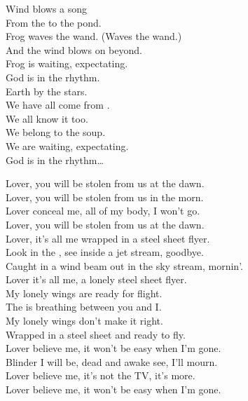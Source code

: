 Wind blows a song \\
From the  to the pond. \\
Frog waves the wand. (Waves the wand.) \\
And the wind blows on beyond. \\

Frog is waiting, expectating. \\
God is in the rhythm. \\

Earth by the stars. \\
We have all come from . \\
We all know it too. \\
We belong to the soup. \\

We are waiting, expectating. \\
God is in the rhythm… \\




Lover, you will be stolen from us at the dawn. \\
Lover, you will be stolen from us in the morn. \\
Lover conceal me, all of my body, I won't go. \\
Lover, you will be stolen from us at the dawn. \\

Lover, it's all me wrapped in a steel sheet flyer. \\
Look in the , see inside a jet stream, goodbye. \\
Caught in a wind beam out in the sky stream, mornin'. \\
Lover it's all me, a lonely steel sheet flyer. \\

My lonely wings are ready for flight. \\
The  is breathing between you and I. \\
My lonely wings don't make it right. \\
Wrapped in a steel sheet and ready to fly. \\

Lover believe me, it won't be easy when I'm gone. \\
Blinder I will be, dead and awake see, I'll mourn. \\
Lover believe me, it's not the TV, it's more. \\
Lover believe me, it won't be easy when I'm gone. \\

